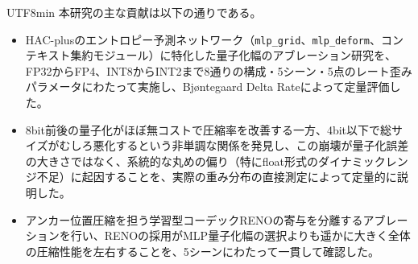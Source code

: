\documentclass{ieeeaccess}
\begin{document}
\begin{CJK}{UTF8}{min}
本研究の主な貢献は以下の通りである。
\begin{itemize}
  \item HAC-plusのエントロピー予測ネットワーク（\texttt{mlp\_grid}、\texttt{mlp\_deform}、コンテキスト集約モジュール）に特化した量子化幅のアブレーション研究を、FP32からFP4、INT8からINT2まで8通りの構成・5シーン・5点のレート歪みパラメータにわたって実施し、Bjøntegaard Delta Rateによって定量評価した。
  \item 8bit前後の量子化がほぼ無コストで圧縮率を改善する一方、4bit以下で総サイズがむしろ悪化するという非単調な関係を発見し、この崩壊が量子化誤差の大きさではなく、系統的な丸めの偏り（特にfloat形式のダイナミックレンジ不足）に起因することを、実際の重み分布の直接測定によって定量的に説明した。
  \item アンカー位置圧縮を担う学習型コーデックRENOの寄与を分離するアブレーションを行い、RENOの採用がMLP量子化幅の選択よりも遥かに大きく全体の圧縮性能を左右することを、5シーンにわたって一貫して確認した。
\end{itemize}
\end{CJK}
\end{document}
